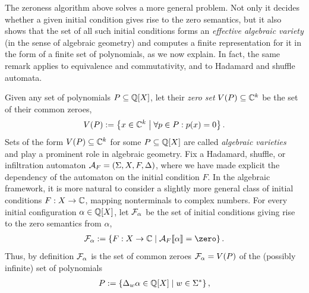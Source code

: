 \begin{remark}
    \label{rem:effective algebraic varieties}
    The zeroness algorithm above solves a more general problem.
    Not only it decides whether a given initial condition gives rise to the zero semantics,
    but it also shows that the set of all such initial conditions
    forms an \emph{effective algebraic variety} (in the sense of algebraic geometry)
    and computes a finite representation for it in the form of a finite set of polynomials, as we now explain.
    In fact, the same remark applies to equivalence and commutativity,
    and to Hadamard and shuffle automata.

    Given any set of polynomials $P \subseteq \mathbb Q[X]$,
    let their \emph{zero set} $V(P) \subseteq \mathbb C^k$ be the set of their common zeroes,
    \begin{align*}
        V(P) := \left\{x \in \mathbb C^k \;\middle|\; \forall p \in P : p(x) = 0\right\}.
    \end{align*}
    Sets of the form $V(P) \subseteq \mathbb C^k$ for some $P \subseteq \mathbb Q[X]$
    are called \emph{algebraic varieties}~\cite[§2, Ch.~1]{CoxLittleOShea:Ideals:2015}
    and play a prominent role in algebraic geometry.
    Fix a Hadamard, shuffle, or infiltration automaton $\mathcal A_F = (\Sigma, X, F, \Delta)$,
    where we have made explicit the dependency of the automaton on the initial condition $F$.
    In the algebraic framework,
    it is more natural to consider a slightly more general class of initial conditions $F : X \to \mathbb C$,
    mapping nonterminals to complex numbers.
    For every initial configuration $\alpha \in \mathbb Q[X]$,
    let $\mathcal F_\alpha$ be the set of initial conditions giving rise to the zero semantics from $\alpha$,
    \begin{align*}
        \FF_\alpha := \setof{F : X \to \C}{\Asem {\AA_F} \alpha = \zero}.
    \end{align*}
    Thus, by definition $\mathcal F_\alpha$ is the set of common zeroes $\mathcal F_\alpha = V(P)$ of the (possibly infinite) set of polynomials
    \begin{align*}
        P := \left\{\Delta_w \alpha \in \mathbb Q[X] \;\middle|\; w \in \Sigma^*\right\},
    \end{align*}

\end{remark}
